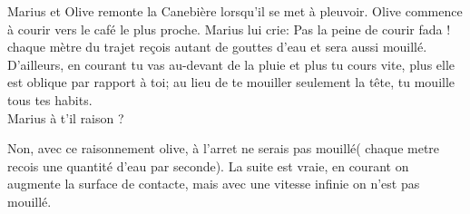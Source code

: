 \begin{Exercise}[title=La pluie]
	Marius et Olive remonte la Canebière lorsqu'il se met à pleuvoir. Olive commence à courir vers le café le plus proche. Marius lui crie: Pas la peine de courir fada ! chaque mètre du trajet reçois autant de gouttes d'eau et sera aussi mouillé. D'ailleurs, en courant tu vas au-devant de la pluie et plus tu cours vite, plus elle est oblique par rapport à toi; au lieu de te mouiller seulement la tête, tu mouille tous tes habits.\\
	Marius à t'il raison ?
\end{Exercise}
\begin{Answer}
Non, avec ce raisonnement olive, à l'arret ne serais pas mouillé( chaque metre  recois une quantité d'eau par seconde). La suite est vraie, en courant on augmente la surface de contacte, mais avec une vitesse infinie on n'est pas mouillé.
\end{Answer}
